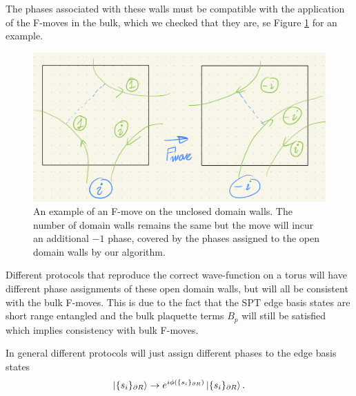 \documentclass[a4paper,twocolumn,11pt]{quantumarticle}
\begin{document}
The phases associated with these walls must be compatible with the application of the F-moves in the bulk, which we checked that they are, se Figure \ref{fig:bulk_edge_move} for an example.\begin{figure}
\centering
\includegraphics[width=\linewidth]{Figures/bulk_F_move.png}
\caption{An example of an F-move on the unclosed domain walls. The number of domain walls remains the same but the move will incur an additional $-1$ phase, covered by the phases assigned to the open domain walls by our algorithm.}
\label{fig:bulk_edge_move}
\end{figure}
Different protocols that reproduce the correct wave-function on a torus will have different phase assignments of these open domain walls, but will all be consistent with the bulk F-moves. This is due to the fact that the SPT edge basis states are short range entangled and the bulk plaquette terms $B_p$ will still be satisfied which implies consistency with bulk F-moves.

In general different protocols will just assign different phases to the edge basis states\begin{equation}
\ket{\{s_i\}_{\partial R}} \rightarrow e^{i\phi(\{s_i\}_{\partial R})}\ket{\{s_i\}_{\partial R}}.  
\end{equation}






\end{document}
